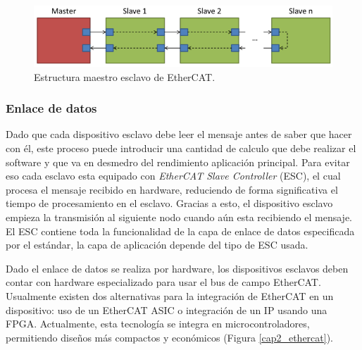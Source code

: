 \begin{figure}[ht]
  \centering
  \includegraphics[scale=.5]{img/cap2/ethercat_chain}
  \caption{Estructura maestro esclavo de EtherCAT.}
  \label{cap2_ethercat_chain}
\end{figure}

\subsubsection{Enlace de datos}

Dado que cada dispositivo esclavo debe leer el mensaje antes de saber que hacer con él, este proceso puede introducir una cantidad de calculo que debe realizar el software y que va en desmedro del rendimiento aplicación principal. Para evitar eso cada esclavo esta equipado con \textit{EtherCAT Slave Controller} (ESC), el cual procesa el mensaje recibido en hardware, reduciendo de forma significativa el tiempo de procesamiento en el esclavo. Gracias a esto, el dispositivo esclavo empieza la transmisión al siguiente nodo cuando aún esta recibiendo el mensaje. El ESC contiene toda la funcionalidad de la capa de enlace de datos especificada por el estándar, la capa de aplicación depende del tipo de ESC usada.

Dado el enlace de datos se realiza por hardware, los dispositivos esclavos deben contar con hardware especializado para usar el bus de campo EtherCAT. Usualmente existen dos alternativas para la integración de EtherCAT en un dispositivo: uso de un EtherCAT ASIC o integración de un IP usando una FPGA. Actualmente, esta tecnología se integra en microcontroladores, permitiendo diseños más compactos y económicos (Figura \ref{cap2_ethercat}).

